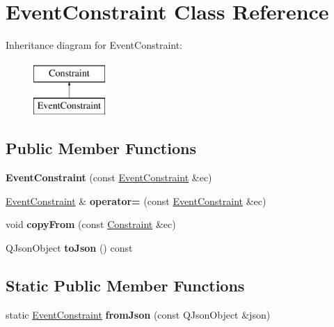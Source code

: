 \hypertarget{class_event_constraint}{\section{Event\-Constraint Class Reference}
\label{class_event_constraint}
}
Inheritance diagram for Event\-Constraint\-:\begin{figure}[H]
\begin{center}
\leavevmode
\includegraphics[height=2.000000cm]{class_event_constraint}
\end{center}
\end{figure}
\subsection*{Public Member Functions}
\begin{DoxyCompactItemize}
\item 
\hypertarget{class_event_constraint_a9932686e5de6cec64330cc557c7fa456}{{\bfseries Event\-Constraint} (const \hyperlink{class_event_constraint}{Event\-Constraint} \&ec)}\label{class_event_constraint_a9932686e5de6cec64330cc557c7fa456}

\item 
\hypertarget{class_event_constraint_ac60c9894951253133c169253a2944573}{\hyperlink{class_event_constraint}{Event\-Constraint} \& {\bfseries operator=} (const \hyperlink{class_event_constraint}{Event\-Constraint} \&ec)}\label{class_event_constraint_ac60c9894951253133c169253a2944573}

\item 
\hypertarget{class_event_constraint_a1b920fe4158853381e7c18273d377e19}{void {\bfseries copy\-From} (const \hyperlink{class_constraint}{Constraint} \&ec)}\label{class_event_constraint_a1b920fe4158853381e7c18273d377e19}

\item 
\hypertarget{class_event_constraint_a1d0138d9b183356a986b7fa438fa3e6c}{Q\-Json\-Object {\bfseries to\-Json} () const }\label{class_event_constraint_a1d0138d9b183356a986b7fa438fa3e6c}

\end{DoxyCompactItemize}
\subsection*{Static Public Member Functions}
\begin{DoxyCompactItemize}
\item 
\hypertarget{class_event_constraint_a985f0f4f5779bb10f69d981fede53a49}{static \hyperlink{class_event_constraint}{Event\-Constraint} {\bfseries from\-Json} (const Q\-Json\-Object \&json)}\label{class_event_constraint_a985f0f4f5779bb10f69d981fede53a49}

\end{DoxyCompactItemize}

